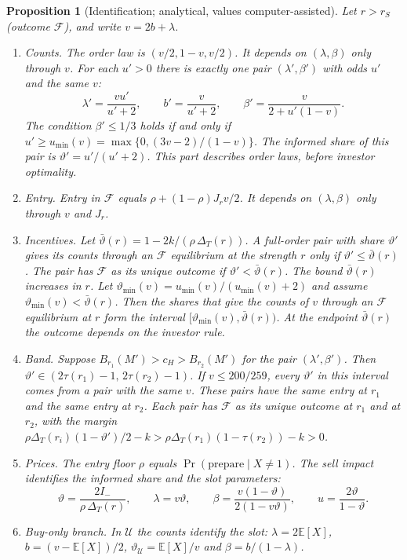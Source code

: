 \documentclass[12pt]{article}
\newtheorem{proposition}{Proposition}
\theoremstyle{definition}
\newcommand{\E}{\mathbb E}
\newcommand{\cH}{c_H}
\begin{document}
\begin{proposition}[Identification; analytical, values computer-assisted]\label{p:ident}
Let $r>r_S$ (outcome $\mathcal F$), and write $v=2b+\lambda$.
\begin{enumerate}[label=(\alph*)]
\item \emph{Counts.} The order law is $(v/2,1-v,v/2)$. It depends on $(\lambda,\beta)$ only through $v$.
For each $u'>0$ there is exactly one pair $(\lambda',\beta')$ with odds $u'$ and the same $v$:
\[
\lambda'=\frac{vu'}{u'+2},\qquad b'=\frac{v}{u'+2},\qquad \beta'=\frac{v}{2+u'(1-v)}.
\]
The condition $\beta'\le 1/3$ holds if and only if $u'\ge u_{\min}(v)=\max\{0,(3v-2)/(1-v)\}$.
The informed share of this pair is $\vartheta'=u'/(u'+2)$.
This part describes order laws, before investor optimality.
\item \emph{Entry.} Entry in $\mathcal F$ equals $\rho+(1-\rho)J_rv/2$. It depends on $(\lambda,\beta)$ only through $v$ and $J_r$.
\item \emph{Incentives.} Let $\bar\vartheta(r)=1-2k/(\rho\,\Delta_T(r))$.
A full-order pair with share $\vartheta'$ gives its counts through an $\mathcal F$ equilibrium at the strength $r$ only if $\vartheta'\le\bar\vartheta(r)$.
The pair has $\mathcal F$ as its unique outcome if $\vartheta'<\bar\vartheta(r)$.
The bound $\bar\vartheta(r)$ increases in $r$.
Let $\vartheta_{\min}(v)=u_{\min}(v)/(u_{\min}(v)+2)$ and assume $\vartheta_{\min}(v)<\bar\vartheta(r)$.
Then the shares that give the counts of $v$ through an $\mathcal F$ equilibrium at $r$ form the interval $[\vartheta_{\min}(v),\bar\vartheta(r))$.
At the endpoint $\bar\vartheta(r)$ the outcome depends on the investor rule.
\item \emph{Band.} Suppose $B_{r_1}(M')>\cH>B_{r_2}(M')$ for the pair $(\lambda',\beta')$.
Then $\vartheta'\in(2\tau(r_1)-1,\,2\tau(r_2)-1)$.
If $v\le200/259$, every $\vartheta'$ in this interval comes from a pair with the same $v$.
These pairs have the same entry at $r_1$ and the same entry at $r_2$.
Each pair has $\mathcal F$ as its unique outcome at $r_1$ and at $r_2$, with the margin $\rho\Delta_T(r_i)(1-\vartheta')/2-k>\rho\Delta_T(r_1)(1-\tau(r_2))-k>0$.
\item \emph{Prices.} The entry floor $\rho$ equals $\Pr(\text{prepare}\mid X\ne1)$. The sell impact identifies the informed share and the slot parameters:
\[
\vartheta=\frac{2I_-}{\rho\,\Delta_T(r)},\qquad \lambda=v\vartheta,\qquad
\beta=\frac{v(1-\vartheta)}{2(1-v\vartheta)},\qquad u=\frac{2\vartheta}{1-\vartheta}.
\]
\item \emph{Buy-only branch.} In $\mathcal U$ the counts identify the slot: $\lambda=2\E[X]$, $b=(v-\E[X])/2$, $\vartheta_{\mathcal U}=\E[X]/v$ and $\beta=b/(1-\lambda)$.
\end{enumerate}
\end{proposition}
\end{document}
